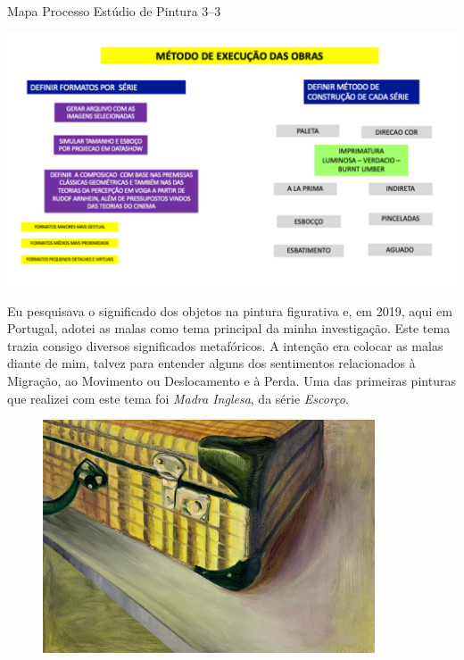 \begin{quadro}
  \centering
  \caption{Mapa Processo Estúdio de Pintura 3--3}
\includegraphics[width=\linewidth]{figuras/quadros/mapa-processo-estudio-pintura3.pdf}
\end{quadro}

Eu pesquisava o significado dos objetos na pintura figurativa e, em
2019, aqui em Portugal, adotei as malas como tema principal da minha
investigação. Este tema trazia consigo diversos significados
metafóricos. A intenção era colocar as malas diante de mim, talvez para
entender alguns dos sentimentos relacionados à Migração, ao Movimento
ou Deslocamento e à Perda. Uma das primeiras pinturas que realizei com
este tema foi \emph{Madra Inglesa}, da série \emph{Escorço}.

\begin{figure}
	\caption{}

	\includegraphics[width=3.87379in,height=2.71183in]{figuras/odette-madra-inglesa-2021.pdf.compressed.pdf}
\end{figure}

